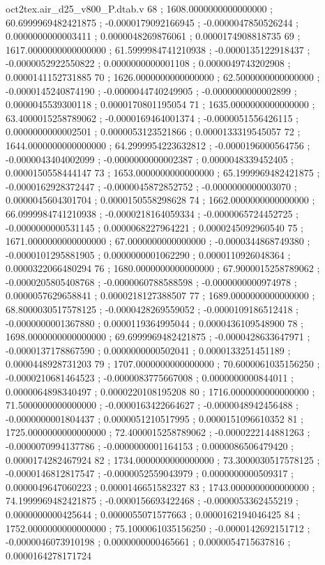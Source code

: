 \begin{filecontents}[overwrite]{oct2tex.air_d25_v800_P.dtab.v}
68 ; 1608.0000000000000000 ; 60.6999969482421875 ; -0.0000179092166945 ; -0.0000047850526244 ; 0.0000000000003411 ; 0.0000048269876061 ; 0.0000174908818735
69 ; 1617.0000000000000000 ; 61.5999984741210938 ; -0.0000135122918437 ; -0.0000052922550822 ; 0.0000000000001108 ; 0.0000049743202908 ; 0.0000141152731885
70 ; 1626.0000000000000000 ; 62.5000000000000000 ; -0.0000145240874190 ; -0.0000044740249905 ; -0.0000000000002899 ; 0.0000045539300118 ; 0.0000170801195054
71 ; 1635.0000000000000000 ; 63.4000015258789062 ; -0.0000169464001374 ; -0.0000051556426115 ; 0.0000000000002501 ; 0.0000053123521866 ; 0.0000133319545057
72 ; 1644.0000000000000000 ; 64.2999954223632812 ; -0.0000196000564756 ; -0.0000043404002099 ; -0.0000000000002387 ; 0.0000048339452405 ; 0.0000150558444147
73 ; 1653.0000000000000000 ; 65.1999969482421875 ; -0.0000162928372447 ; -0.0000045872852752 ; -0.0000000000003070 ; 0.0000045604301704 ; 0.0000150558298628
74 ; 1662.0000000000000000 ; 66.0999984741210938 ; -0.0000218164059334 ; -0.0000065724452725 ; -0.0000000000531145 ; 0.0000068227964221 ; 0.0000245092960540
75 ; 1671.0000000000000000 ; 67.0000000000000000 ; -0.0000344868749380 ; -0.0000101295881905 ; 0.0000000001062290 ; 0.0000110926048364 ; 0.0000322066480294
76 ; 1680.0000000000000000 ; 67.9000015258789062 ; -0.0000205805408768 ; -0.0000060788588598 ; -0.0000000000974978 ; 0.0000057629658841 ; 0.0000218127388507
77 ; 1689.0000000000000000 ; 68.8000030517578125 ; -0.0000428269559052 ; -0.0000109186512418 ; -0.0000000001367880 ; 0.0000119364995044 ; 0.0000436109548900
78 ; 1698.0000000000000000 ; 69.6999969482421875 ; -0.0000428633647971 ; -0.0000137178867590 ; 0.0000000000502041 ; 0.0000133251451189 ; 0.0000448928731203
79 ; 1707.0000000000000000 ; 70.6000061035156250 ; -0.0000210681464523 ; -0.0000083775667008 ; 0.0000000000844011 ; 0.0000064898340497 ; 0.0000220108195208
80 ; 1716.0000000000000000 ; 71.5000000000000000 ; -0.0000163422664627 ; -0.0000048942456488 ; -0.0000000001804437 ; 0.0000051210517995 ; 0.0000151096610352
81 ; 1725.0000000000000000 ; 72.4000015258789062 ; -0.0000222144881263 ; -0.0000070994137786 ; -0.0000000001164153 ; 0.0000086506479420 ; 0.0000174282467924
82 ; 1734.0000000000000000 ; 73.3000030517578125 ; -0.0000146812817547 ; -0.0000052559043979 ; 0.0000000000509317 ; 0.0000049647060223 ; 0.0000146651582327
83 ; 1743.0000000000000000 ; 74.1999969482421875 ; -0.0000156693422468 ; -0.0000053362455219 ; 0.0000000000425644 ; 0.0000055071577663 ; 0.0000162194046425
84 ; 1752.0000000000000000 ; 75.1000061035156250 ; -0.0000142692151712 ; -0.0000046073910198 ; 0.0000000000465661 ; 0.0000054715637816 ; 0.0000164278171724

\end{filecontents}
